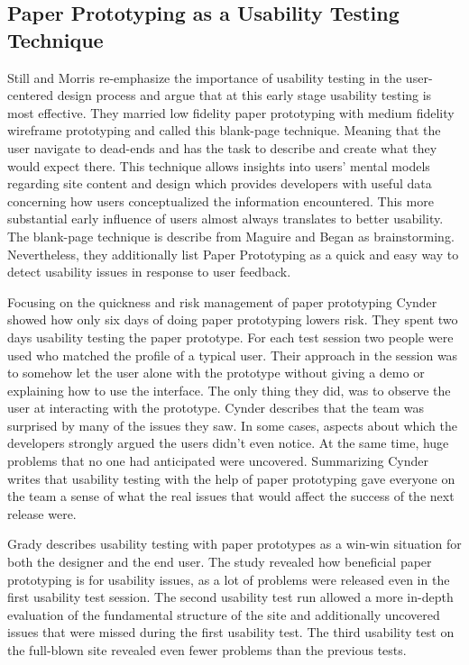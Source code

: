 \subsection{Paper Prototyping as a Usability Testing Technique}

Still and Morris \cite{still2010blank} re-emphasize the importance of usability testing in the user-centered design process and argue that at this early stage usability testing is most effective. They married low fidelity paper prototyping with medium fidelity wireframe prototyping and called this blank-page technique. Meaning that the user navigate to dead-ends and has the task to describe and create what they would expect there. This technique allows insights into users’ mental models regarding site content and design which provides developers with useful data concerning how users conceptualized the information encountered. This more substantial early influence of users almost always translates to better usability. The blank-page technique is describe from Maguire and Began \cite{maguire2002user} as brainstorming. Nevertheless, they additionally list Paper Prototyping as a quick and easy way to detect usability issues in response to user feedback.

Focusing on the quickness and risk management of paper prototyping Cynder \cite{snyder1996using} showed how only six days of doing paper prototyping lowers risk. They spent two days usability testing the paper prototype. For each test session two people were used who matched the profile of a typical user. Their approach in the session was to somehow let the user alone with the prototype without giving a demo or explaining how to use the interface. The only thing they did, was to observe the user at interacting with the prototype. Cynder describes that the team was surprised by many of the issues they saw. In some cases, aspects about which the developers strongly argued the users didn't even notice. At the same time, huge problems that no one had anticipated were uncovered. Summarizing Cynder writes that usability testing with the help of paper prototyping gave everyone on the team a sense of what the real issues that would affect the success of the next release were.

Grady \cite{grady2000web} describes usability testing with paper prototypes as a
win-win situation for both the designer and the end user. The study revealed how beneficial paper prototyping is for usability issues, as a lot of problems were released even in the first usability test session. The second usability test run allowed a more in-depth evaluation of the fundamental structure of the site and additionally uncovered issues that were missed during the first usability test. The third usability
test on the full-blown site revealed even fewer problems than the previous tests.

